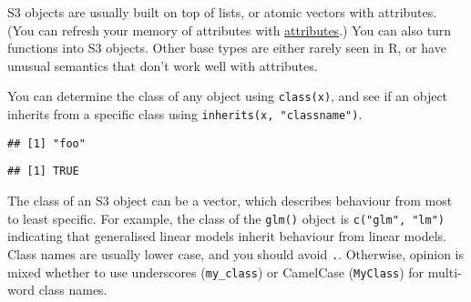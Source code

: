 \begin{Shaded}
\begin{Highlighting}[]
\StringTok{ }\NormalTok{(}\NormalTok{(), } \NormalTok{)}

\StringTok{ }\NormalTok{()}
\end{Highlighting}
\end{Shaded}

S3 objects are usually built on top of lists, or atomic vectors with
attributes. (You can refresh your memory of attributes with
\protect\hyperlink{attributes}{attributes}.) You can also turn functions
into S3 objects. Other base types are either rarely seen in R, or have
unusual semantics that don't work well with attributes.

You can determine the class of any object using \texttt{class(x)}, and
see if an object inherits from a specific class using
\texttt{inherits(x,\ "classname")}. 

\begin{Shaded}
\begin{Highlighting}[]
\end{Highlighting}
\end{Shaded}

\begin{verbatim}
## [1] "foo"
\end{verbatim}

\begin{Shaded}
\begin{Highlighting}[]
\NormalTok{)}
\end{Highlighting}
\end{Shaded}

\begin{verbatim}
## [1] TRUE
\end{verbatim}

The class of an S3 object can be a vector, which describes behaviour
from most to least specific. For example, the class of the
\texttt{glm()} object is \texttt{c("glm",\ "lm")} indicating that
generalised linear models inherit behaviour from linear models. Class
names are usually lower case, and you should avoid \texttt{.}.
Otherwise, opinion is mixed whether to use underscores
(\texttt{my\_class}) or CamelCase (\texttt{MyClass}) for multi-word
class names.

